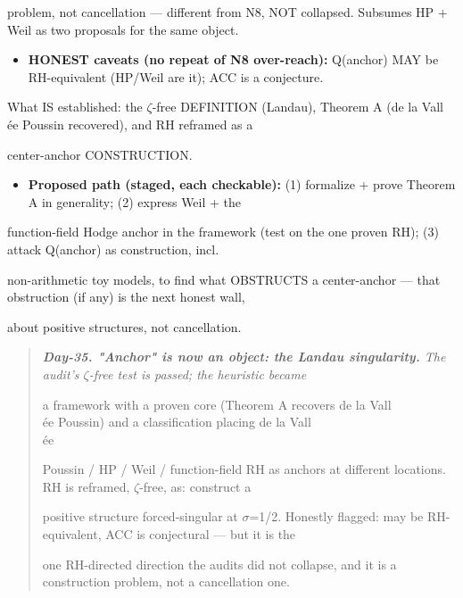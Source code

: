 \documentclass[10pt]{article}
\begin{document}
  problem, not cancellation --- different from N8, NOT collapsed. Subsumes HP + Weil as two proposals for the same object.\par
\begin{itemize}
\item \textbf{HONEST caveats (no repeat of N8 over-reach):} Q(anchor) MAY be RH-equivalent (HP/Weil are it); ACC is a conjecture.
\end{itemize}
  What IS established: the \ensuremath{\zeta}-free DEFINITION (Landau), Theorem A (de la Vall\\\'ee Poussin recovered), and RH reframed as a\par
  center-anchor CONSTRUCTION.\par
\begin{itemize}
\item \textbf{Proposed path (staged, each checkable):} (1) formalize + prove Theorem A in generality; (2) express Weil + the
\end{itemize}
  function-field Hodge anchor in the framework (test on the one proven RH); (3) attack Q(anchor) as construction, incl.\par
  non-arithmetic toy models, to find what OBSTRUCTS a center-anchor --- that obstruction (if any) is the next honest wall,\par
  about positive structures, not cancellation.\par

\begin{quote}\itshape
\textbf{Day-35. "Anchor" is now an object: the Landau singularity.} The audit's \ensuremath{\zeta}-free test is passed; the heuristic became\par
a framework with a proven core (Theorem A recovers de la Vall\\\'ee Poussin) and a classification placing de la Vall\\\'ee\par
Poussin / HP / Weil / function-field RH as anchors at different locations. RH is reframed, \ensuremath{\zeta}-free, as: construct a\par
positive structure forced-singular at \ensuremath{\sigma}=1/2. Honestly flagged: may be RH-equivalent, ACC is conjectural --- but it is the\par
one RH-directed direction the audits did not collapse, and it is a construction problem, not a cancellation one.\par
\end{quote}
\end{document}
